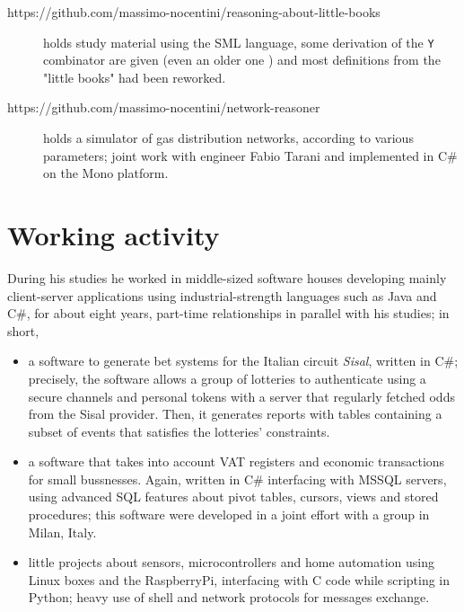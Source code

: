 \documentclass[a4paper]{tufte-handout}
\begin{document}
\begin{description}
        \item[https://github.com/massimo-nocentini/reasoning-about-little-books]
        holds study material using the SML language, some derivation of the \verb|Y|
        combinator are given (even an older one ) and most definitions from
        the "little books" had been reworked.

        \item[https://github.com/massimo-nocentini/network-reasoner] holds a
        simulator of gas distribution networks, according to various
        parameters; joint work with engineer Fabio Tarani and implemented in
        C\# on the Mono platform.
        

        
    \end{description}

    \section{Working activity}

    During his studies he worked in middle-sized software houses
     developing mainly client-server
    applications using industrial-strength languages such as Java and C\#, for
    about eight years, part-time relationships in parallel with his studies; in short,
    \begin{itemize}
        \item a software to generate bet systems for the Italian circuit
        \textit{Sisal}, written in C\#; precisely, the software allows a group
        of lotteries to authenticate using a secure channels and personal
        tokens with a server that regularly fetched odds from the Sisal
        provider. Then, it generates reports with tables containing a
        subset of events that satisfies the lotteries' constraints.
        \item a software that takes into account VAT registers and economic
        transactions for small bussnesses. Again, written in C\# interfacing 
        with MSSQL servers, using advanced SQL features about pivot tables,
        cursors, views and stored procedures; this software were developed in
        a joint effort with a group in Milan, Italy.
        \item little projects about sensors, microcontrollers and home
        automation using Linux boxes and the RaspberryPi, interfacing with C
        code while scripting in Python; heavy use of shell and network protocols
        for messages exchange.
    \end{itemize}
        
    
\end{document}
